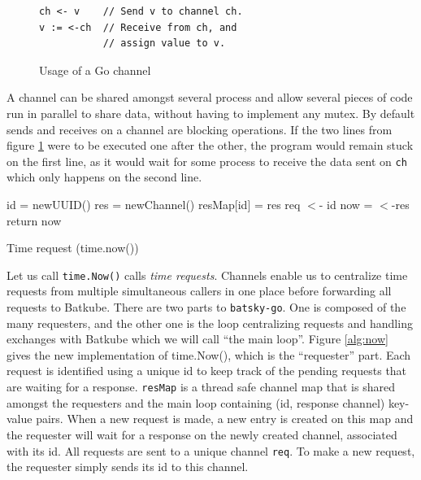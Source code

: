 \begin{figure}[]
	\begin{verbatim}
ch <- v    // Send v to channel ch.
v := <-ch  // Receive from ch, and
           // assign value to v.
   \end{verbatim}
   \caption{Usage of a Go channel}
   \label{fig:go-channel}
\end{figure}

A channel can be shared amongst several process and allow several pieces of
code run in parallel to share data, without having to implement any mutex. By
default sends and receives on a channel are blocking operations. If the two
lines from figure \ref{fig:go-channel} were to be executed one after the other,
the program would remain stuck on the first line, as it would wait for some
process to receive the data sent on \texttt{ch} which only happens on the
second line.\\


\begin{algorithm}[]
\DontPrintSemicolon
{}

id = newUUID()\;
res = newChannel()\;
resMap[id] = res 
req $<$- id 
now = $<$-res 
return now\;
\caption{Time request (time.now())}
\label{alg:now}
\end{algorithm}

Let us call \texttt{time.Now()} calls \textit{time requests}. Channels enable
us to centralize time requests from multiple simultaneous callers in one place
before forwarding all requests to Batkube. There are two parts to
\texttt{batsky-go}. One is composed of the many requesters, and the other one
is the loop centralizing requests and handling exchanges with Batkube which we
will call ``the main loop''.  Figure \ref{alg:now} gives the new implementation
of time.Now(), which is the ``requester'' part. Each request is identified
using a unique id to keep track of the pending requests that are waiting for a
response. \texttt{resMap} is a thread safe channel map that is shared amongst
the requesters and the main loop containing (id, response channel) key-value
pairs. When a new request is made, a new entry is created on this map and the
requester will wait for a response on the newly created channel, associated
with its id. All requests are sent to a unique channel \texttt{req}. To make a
new request, the requester simply sends its id to this channel.

